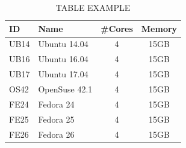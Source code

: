 \begin{table}[!t]
\begin{center}
{\footnotesize
\begin{tabular}{| l | l | c | c |}\hline
\textbf{ID} & \textbf{Name}  & \textbf{\#Cores} & \textbf{Memory}  \\\hline\hline
UB14 & Ubuntu 14.04 & 4 & 15GB  \\ \hline
UB16 & Ubuntu 16.04 & 4 & 15GB \\ \hline
UB17 & Ubuntu 17.04 & 4 & 15GB\\ \hline
OS42 & OpenSuse 42.1 & 4 & 15GB \\ \hline
FE24 & Fedora 24 & 4 & 15GB  \\ \hline
FE25 & Fedora 25 & 4 & 15GB  \\ \hline
FE26 & Fedora 26 & 4 & 15GB \\ \hline
\end{tabular}
}
\caption{TABLE EXAMPLE}
\label{tab:oses}
\end{center}
\end{table}


